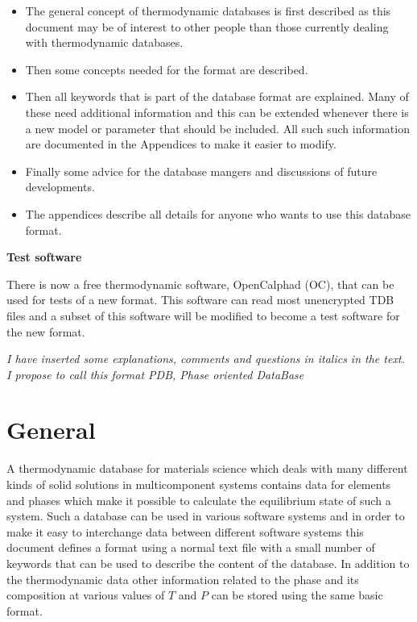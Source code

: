 \documentclass[12pt]{article}
\begin{document}
\begin{itemize}
\item The general concept of thermodynamic databases is first
  described as this document may be of interest to other people than
  those currently dealing with thermodynamic databases.

\item Then some concepts needed for the format are described.

\item Then all keywords that is part of the database format are
  explained.  Many of these need additional information and this can
  be extended whenever there is a new model or parameter that should
  be included.  All such such information are documented in the
  Appendices to make it easier to modify.

\item Finally some advice for the database mangers and discussions of
  future developments.

\item The appendices describe all details for anyone who wants to use
  this database format.
\end{itemize}

\bigskip

{\bf Test software}

\bigskip

There is now a free thermodynamic software, OpenCalphad (OC), that can
be used for tests of a new format.  This software can read most
unencrypted TDB files and a subset of this software will be modified
to become a test software for the new format.

\vspace{10mm}

{\em I have inserted some explanations, comments and questions in
  italics in the text.  I propose to call this format PDB, Phase
  oriented DataBase}

\newpage

\tableofcontents

\newpage

\section{General}

A thermodynamic database for materials science which deals with many
different kinds of solid solutions in multicomponent systems contains
data for elements and phases which make it possible to calculate the
equilibrium state of such a system.  Such a database can be used in
various software systems and in order to make it easy to interchange
data between different software systems this document defines a format
using a normal text file with a small number of keywords that can be
used to describe the content of the database.  In addition to the
thermodynamic data other information related to the phase and its
composition at various values of $T$ and $P$ can be stored using the
same basic format.
\end{document}
